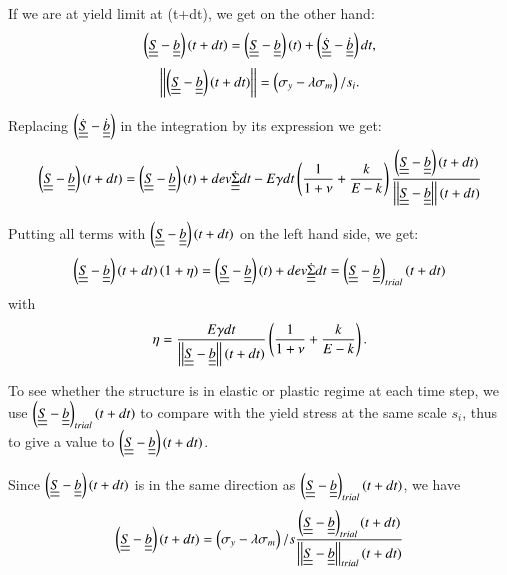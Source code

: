 \documentclass[3p,times,procedia,number]{elsarticle}
\begin{document}
If we are at yield limit at (t+dt), we get on the other hand:
$$\left( \uline{\uline{S}}-\uline{\uline{b}}\right) (t+dt)=\left( \uline{\uline{S}}-\uline{\uline{b}}\right) (t)+\left( \dot{\uline{\uline{S}}}- \dot{\uline{\uline{b}}}\right) dt,$$
\begin{equation}\left| \left| \left( \uline{\uline{S}}-\uline{\uline{b}}\right) (t+dt)\right| \right| =\left( \sigma_y-\lambda \sigma_m\right)/s_i .
\end{equation}

Replacing $\left( \dot{\uline{\uline{S}}}-\dot{\uline{\uline{b}}}\right) $ in the integration by its expression we get:
\begin{equation}
	\left( \uline{\uline{S}}-\uline{\uline{b}}\right) (t+dt)=\left( \uline{\uline{S}}-\uline{\uline{b}}\right) (t)+dev\dot{\uline{\uline{\Sigma}}}dt-E\gamma dt\left(\dfrac{1}{1+\nu}+\dfrac{k}{E-k} \right) \dfrac{\left( \uline{\uline{S}}-\uline{\uline{b}}\right) (t+dt)}{\left| \left|\uline{\uline{S}}-\uline{\uline{b}}\right| \right| (t+dt)}
\end{equation}

Putting all terms with $ \left( \uline{\uline{S}}-\uline{\uline{b}}\right) (t+dt)$ on the left hand side, we get:
\begin{equation}
	\left( \uline{\uline{S}}-\uline{\uline{b}}\right) (t+dt)\left(  1+\eta\right) =\left( \uline{\uline{S}}-\uline{\uline{b}}\right) (t)+dev\dot{\uline{\uline{\Sigma}}}dt=\left( \uline{\uline{S}}-\uline{\uline{b}}\right)_{trial} (t+dt)
	\label{eqyield}
\end{equation}
with\begin{equation}\eta=\dfrac{E\gamma dt}{\left| \left|\uline{\uline{S}}-\uline{\uline{b}}\right| \right|(t+dt)}\left(\dfrac{1}{1+\nu}+\dfrac{k}{E-k} \right).
	\label{eta}
\end{equation}

To see whether the structure is in elastic or plastic regime at each time step, we use $\left( \uline{\uline{S}}-\uline{\uline{b}}\right)_{trial}(t+dt)$ to compare with the yield stress at the same scale $s_i$, thus to give a value to $\left( \uline{\uline{S}}-\uline{\uline{b}}\right)(t+dt)$.

Since $\left( \uline{\uline{S}}-\uline{\uline{b}}\right)(t+dt)$ is in the same direction as $\left( \uline{\uline{S}}-\uline{\uline{b}}\right)_{trial}(t+dt)$, we have
\begin{equation}\left( \uline{\uline{S}}-\uline{\uline{b}}\right) (t+dt)= \left( \sigma_y-\lambda \sigma_m\right)/s\dfrac{\left( \uline{\uline{S}}-\uline{\uline{b}}\right)_{trial}(t+dt)}{\left| \left|\uline{\uline{S}}-\uline{\uline{b}}\right| \right|_{trial}(t+dt)}
	\label{eqdirection}\end{equation}
\end{document}
